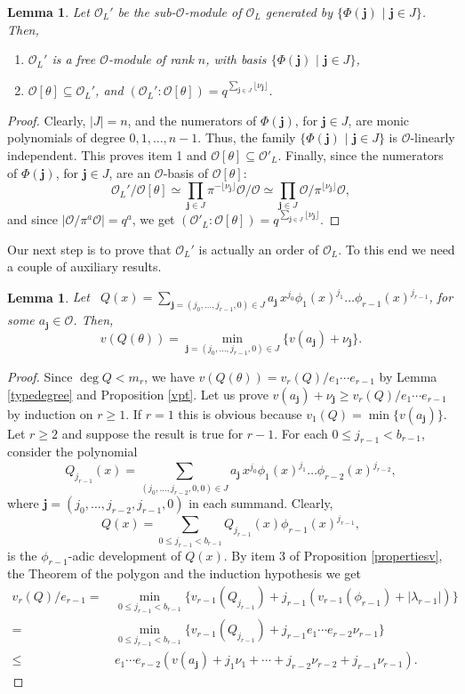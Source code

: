 \documentclass{amsart}
\newtheorem{lemma}[theorem]{Lemma}
\def\op{\operatorname}
\def\dg{\op{deg}}
\def\j{\mathbf{j}}
\def\la{\lambda}
\def\ol{{\mathcal O}_L}
\def\oo{{\mathcal O}}
\def\t{\theta}
\def\tq{\,\,|\,\,}
\begin{document}
\begin{lemma}\label{partialindex}
Let $\ol'$ be the sub-$\oo$-module of $\ol$ generated by $\{\Phi(\j)\tq \j\in J\}$. Then,
\begin{enumerate}
 \item  $\ol'$ is a free $\oo$-module of rank $n$, with basis $\{\Phi(\j)\tq \j\in J\}$,
\item $\oo[\t]\subseteq \ol'$, and $\left(\ol'\colon \oo[\t]\right)=q^{\sum_{\j\in J}\lfloor \nu_{\j}\rfloor}$.
\end{enumerate}
\end{lemma}

\begin{proof}
Clearly, $|J|=n$, and the numerators of $\Phi(\j)$, for $\j\in J$, are monic polynomials of degree $0,1,\dots,n-1$. Thus, the family  $\{\Phi(\j)\tq \j\in J\}$ is $\oo$-linearly independent. This proves item 1 and $\oo[\t]\subseteq \oo'_L$. Finally, since the numerators of $\Phi(\j)$, for $\j\in J$, are an $\oo$-basis of $\oo[\t]$: 
$$
\ol'/\oo[\t]\simeq \prod_{\j\in J}\pi^{-\lfloor \nu_{\j}\rfloor}\oo/\oo\simeq \prod_{\j\in J}\oo/\pi^{\lfloor \nu_{\j}\rfloor}\oo,
$$
and since $|\oo/\pi^a\oo|=q^a$, we get $\left(\oo'_L\colon \oo[\t]\right)=q^{\sum_{\j\in J}\lfloor \nu_{\j}\rfloor}$.
\end{proof}

Our next step is to prove that $\ol'$ is actually an order of $\oo_L$. To this end we need a couple of auxiliary results.
\begin{lemma}
Let \ $Q(x)=\sum_{\j=(j_0,\dots,j_{r-1},0)\in J}a_\j\, x^{j_0}\phi_1(x)^{j_1}\dots\phi_{r-1}(x)^ {j_{r-1}}$, for some $a_\j\in\oo$. Then, 
$$
v(Q(\t))=\min_{\j=(j_0,\dots,j_{r-1},0)\in J}\{v(a_\j)+\nu_{\j}\}.
$$
\end{lemma}

\begin{proof}
Since $\dg Q<m_r$, we have $v(Q(\t))=v_r(Q)/e_1\cdots e_{r-1}$ by Lemma \ref{typedegree} and Proposition
\ref{vpt}. Let us prove $v(a_\j)+\nu_{\j}\ge v_r(Q)/e_1\cdots e_{r-1}$ by induction on $r\ge 1$. If $r=1$ this is obvious because $v_1(Q)=\min\{v(a_\j)\}$. Let $r\ge 2$ and suppose the result is true for $r-1$. For each $0\le j_{r-1}<b_{r-1}$, consider the polynomial
$$
Q_{j_{r-1}}(x)=\sum_{(j_0,\dots,j_{r-2},0,0)\in J}a_\j\, x^{j_0}\phi_1(x)^{j_1}\dots\phi_{r-2}(x)^ {j_{r-2}},
$$ where $\j=(j_0,\dots,j_{r-2},j_{r-1},0)$ in each summand. Clearly, $$Q(x)=\sum_{0\le j_{r-1}<b_{r-1}}Q_{j_{r-1}}(x)\phi_{r-1}(x)^{j_{r-1}},
$$ is the $\phi_{r-1}$-adic development of $Q(x)$. By item 3 of Proposition \ref{propertiesv}, the Theorem of the polygon and the induction hypothesis we get
\begin{align*}
v_r(Q)/e_{r-1}=&\,\min_{0\le j_{r-1}<b_{r-1}}\{v_{r-1}(Q_{j_{r-1}})+j_{r-1}(v_{r-1}(\phi_{r-1})+|\la_{r-1}|)\}\\
=&\,\min_{0\le j_{r-1}<b_{r-1}}\{v_{r-1}(Q_{j_{r-1}})+j_{r-1}e_1\cdots e_{r-2}\nu_{r-1}\}\\
\le&\, e_1\cdots e_{r-2}\left(v(a_\j)+j_1\nu_1+\cdots+j_{r-2}\nu_{r-2}+j_{r-1}\nu_{r-1}\right).
\end{align*}
\end{proof}
\end{document}
